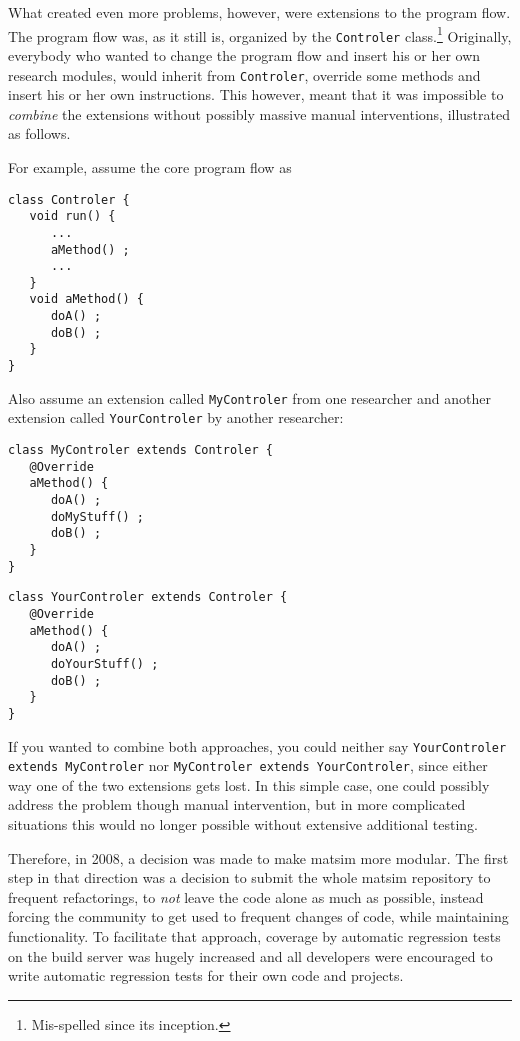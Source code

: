 What created even more problems, however, were extensions to the program flow.  The program flow was, as it still is, organized by the \lstinline$Controler$ class.\footnote{Mis-spelled since its inception.}  Originally, everybody who wanted to change the program flow and insert his or her own research \glspl{module}, would inherit from \lstinline$Controler$, override some methods and insert his or her own instructions.  This however, meant that it was impossible to \emph{combine} the \glspl{extension} without possibly massive manual interventions, illustrated as follows.

For example, assume the core program flow as
\begin{lstlisting}
class Controler {
   void run() {
      ...
      aMethod() ;
      ...
   }
   void aMethod() {
      doA() ;
      doB() ;
   }
}
\end{lstlisting}
Also assume an extension called \protect\lstinline$MyControler$
from one researcher and another extension called \protect\lstinline$YourControler$ by another researcher:
\begin{lstlisting}
class MyControler extends Controler {
   @Override
   aMethod() {
      doA() ;
      doMyStuff() ;
      doB() ;
   }
}
\end{lstlisting}
\begin{lstlisting}
class YourControler extends Controler {
   @Override
   aMethod() {
      doA() ;
      doYourStuff() ;
      doB() ;
   }
}  
\end{lstlisting}
%
If you wanted to combine both approaches, you could neither say \protect\lstinline$YourControler extends MyControler$ nor \protect\lstinline$MyControler extends YourControler$, since either way one of the two extensions gets lost.  In this simple case, one could possibly address the problem though manual intervention, but in more complicated situations this would no longer possible without extensive additional testing. %

Therefore, in 2008, a decision was made to make \gls{matsim} more modular.  The first step in that direction was a decision to submit the whole \gls{matsim} repository to frequent refactorings, \ie to \emph{not} leave the code alone as much as possible, instead forcing the community to get used to frequent changes of code, while maintaining functionality. To facilitate that approach, coverage by automatic regression tests on the build server was hugely increased and all developers were encouraged to write automatic regression tests for their own code and projects. 


